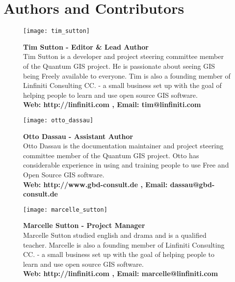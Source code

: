 
\thispagestyle{empty}


\section*{Authors and Contributors}


\begin{figure}[ht]
\centering
\begin{minipage}[h]{5cm}\texttt{[image: tim\_sutton]}
\end{minipage}
\begin{minipage}[h]{11cm} 
\textbf{Tim Sutton - Editor \& Lead Author} \\
Tim Sutton is a developer and project steering committee member of the
Quantum GIS project. He is passionate about seeing GIS being Freely available
to everyone. Tim is also a founding member of Linfiniti Consulting CC. - a
small business set up with the goal of helping people to learn and use open
source GIS software. \\
\textbf{Web: http://linfiniti.com , Email: tim@linfiniti.com}
\end{minipage}
\end{figure}

\begin{figure}[ht]
\centering
\begin{minipage}[h]{5cm}\texttt{[image: otto\_dassau]}
\end{minipage}
\begin{minipage}[h]{11cm}
\textbf{Otto Dassau - Assistant Author} \\
Otto Dassau is the documentation maintainer and project steering committee
member of the Quantum GIS project. Otto has considerable experience in using
and training people to use Free and Open Source GIS software. \\
\textbf{Web: http://www.gbd-consult.de , Email: dassau@gbd-consult.de}
\end{minipage}
\end{figure}

\begin{figure}[ht]
\centering
\begin{minipage}[h]{5cm}\texttt{[image: marcelle\_sutton]}
\end{minipage}
\begin{minipage}[h]{11cm}
\textbf{Marcelle Sutton - Project Manager} \\
Marcelle Sutton studied english and drama and is a qualified teacher.
Marcelle is also a founding member of Linfiniti Consulting CC. - a
small business set up with the goal of helping people to learn and use open
source GIS software. \\
\textbf{Web: http://linfiniti.com , Email: marcelle@linfiniti.com}
\end{minipage}
\end{figure}

